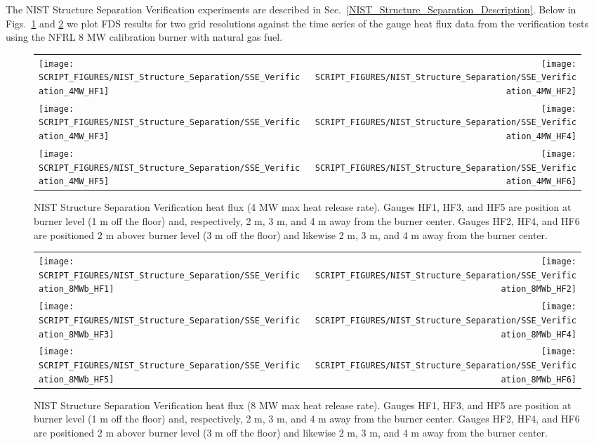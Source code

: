 The NIST Structure Separation Verification experiments are described in Sec.~\ref{NIST_Structure_Separation_Description}.  Below in Figs.~\ref{NIST_SSE_Verification_HF_4MW} and \ref{NIST_SSE_Verification_HF_8MW} we plot FDS results for two grid resolutions against the time series of the gauge heat flux data from the verification tests using the NFRL 8 MW calibration burner with natural gas fuel.

\begin{figure}[!ht]
\begin{tabular*}{\textwidth}{l@{\extracolsep{\fill}}r}
\texttt{[image: SCRIPT\_FIGURES/NIST\_Structure\_Separation/SSE\_Verification\_4MW\_HF1]} &
\texttt{[image: SCRIPT\_FIGURES/NIST\_Structure\_Separation/SSE\_Verification\_4MW\_HF2]} \\
\texttt{[image: SCRIPT\_FIGURES/NIST\_Structure\_Separation/SSE\_Verification\_4MW\_HF3]} &
\texttt{[image: SCRIPT\_FIGURES/NIST\_Structure\_Separation/SSE\_Verification\_4MW\_HF4]} \\
\texttt{[image: SCRIPT\_FIGURES/NIST\_Structure\_Separation/SSE\_Verification\_4MW\_HF5]} &
\texttt{[image: SCRIPT\_FIGURES/NIST\_Structure\_Separation/SSE\_Verification\_4MW\_HF6]}
\end{tabular*}
\caption[NIST Structure Separation Verification heat flux (4 MW)]
{NIST Structure Separation Verification heat flux (4 MW max heat release rate).  Gauges HF1, HF3, and HF5 are position at burner level (1 m off the floor) and, respectively, 2 m, 3 m, and 4 m away from the burner center.  Gauges HF2, HF4, and HF6 are positioned 2 m abover burner level (3 m off the floor) and likewise 2 m, 3 m, and 4 m away from the burner center.}
\label{NIST_SSE_Verification_HF_4MW}
\end{figure}

\begin{figure}[!ht]
\begin{tabular*}{\textwidth}{l@{\extracolsep{\fill}}r}
\texttt{[image: SCRIPT\_FIGURES/NIST\_Structure\_Separation/SSE\_Verification\_8MWb\_HF1]} &
\texttt{[image: SCRIPT\_FIGURES/NIST\_Structure\_Separation/SSE\_Verification\_8MWb\_HF2]} \\
\texttt{[image: SCRIPT\_FIGURES/NIST\_Structure\_Separation/SSE\_Verification\_8MWb\_HF3]} &
\texttt{[image: SCRIPT\_FIGURES/NIST\_Structure\_Separation/SSE\_Verification\_8MWb\_HF4]} \\
\texttt{[image: SCRIPT\_FIGURES/NIST\_Structure\_Separation/SSE\_Verification\_8MWb\_HF5]} &
\texttt{[image: SCRIPT\_FIGURES/NIST\_Structure\_Separation/SSE\_Verification\_8MWb\_HF6]}
\end{tabular*}
\caption[NIST Structure Separation Verification heat flux (8 MW)]
{NIST Structure Separation Verification heat flux (8 MW max heat release rate).  Gauges HF1, HF3, and HF5 are position at burner level (1 m off the floor) and, respectively, 2 m, 3 m, and 4 m away from the burner center.  Gauges HF2, HF4, and HF6 are positioned 2 m abover burner level (3 m off the floor) and likewise 2 m, 3 m, and 4 m away from the burner center.}
\label{NIST_SSE_Verification_HF_8MW}
\end{figure}


